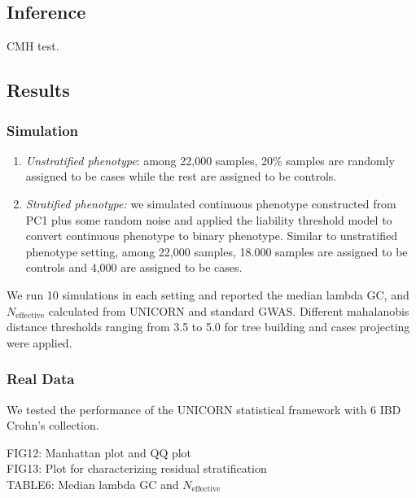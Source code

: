 \documentclass[12pt]{amsart}
\begin{document}
\subsection{Inference}
CMH test.

\subsection{Results}

\subsubsection{Simulation}
\begin{enumerate}
\item \emph{Unstratified phenotype}: among 22,000 samples, 20\% samples are randomly assigned to be cases while the rest are assigned to be controls. 
\item \emph{Stratified phenotype:} we simulated continuous phenotype constructed from PC1 plus some random noise and applied the liability threshold model to convert continuous phenotype to binary phenotype. Similar to unstratified phenotype setting, among 22,000 samples, 18.000 samples are assigned to be controls and 4,000 are assigned to be cases. 
\end{enumerate}
We run 10 simulations in each setting and reported the median lambda GC, and $N_{\mbox{effective}}$ calculated from UNICORN and standard GWAS. Different mahalanobis distance thresholds ranging from 3.5 to 5.0 for tree building and cases projecting were applied. 

\subsubsection{Real Data} We tested the performance of the UNICORN statistical framework with 6 IBD Crohn's collection. 


\begin{center}
{\color{red} FIG12: Manhattan plot and QQ plot}\\
{\color{red} FIG13: Plot for characterizing residual stratification}\\
{\color{red} TABLE6: Median lambda GC and $N_{\mbox{effective}}$}
\end{center}

\printbibliography
\end{document}
